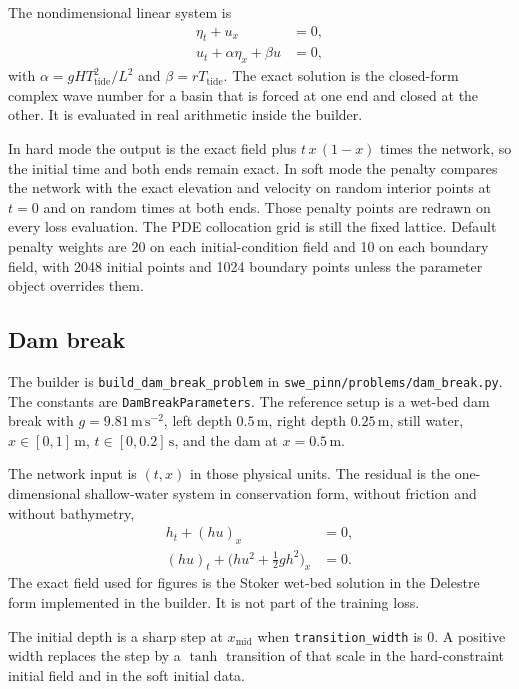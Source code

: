 \documentclass[11pt]{article}
\begin{document}
The nondimensional linear system is
\begin{align}
\eta_{t}+u_{x}&=0,\\
u_{t}+\alpha\eta_{x}+\beta u&=0,
\end{align}
with \(\alpha=gHT_{\mathrm{tide}}^{2}/L^{2}\) and \(\beta=rT_{\mathrm{tide}}\).
The exact solution is the closed-form complex wave number for a basin that is forced at one end and closed at the other.
It is evaluated in real arithmetic inside the builder.

In hard mode the output is the exact field plus \(t\,x\,(1-x)\) times the network, so the initial time and both ends remain exact.
In soft mode the penalty compares the network with the exact elevation and velocity on random interior points at \(t=0\) and on random times at both ends.
Those penalty points are redrawn on every loss evaluation.
The PDE collocation grid is still the fixed lattice.
Default penalty weights are 20 on each initial-condition field and 10 on each boundary field, with 2048 initial points and 1024 boundary points unless the parameter object overrides them.

\subsection{Dam break}

The builder is \texttt{build\_dam\_break\_problem} in \texttt{swe\_pinn/problems/dam\_break.py}.
The constants are \texttt{DamBreakParameters}.
The reference setup is a wet-bed dam break with \(g=9.81\,\mathrm{m\,s^{-2}}\), left depth \(0.5\,\mathrm{m}\), right depth \(0.25\,\mathrm{m}\), still water, \(x\in[0,1]\,\mathrm{m}\), \(t\in[0,0.2]\,\mathrm{s}\), and the dam at \(x=0.5\,\mathrm{m}\).

The network input is \((t,x)\) in those physical units.
The residual is the one-dimensional shallow-water system in conservation form, without friction and without bathymetry,
\begin{align}
h_{t}+(hu)_{x}&=0,\\
(hu)_{t}+\big(hu^{2}+\tfrac12 g h^{2}\big)_{x}&=0.
\end{align}
The exact field used for figures is the Stoker wet-bed solution in the Delestre form implemented in the builder.
It is not part of the training loss.

The initial depth is a sharp step at \(x_{\mathrm{mid}}\) when \texttt{transition\_width} is 0.
A positive width replaces the step by a \(\tanh\) transition of that scale in the hard-constraint initial field and in the soft initial data.
\end{document}
